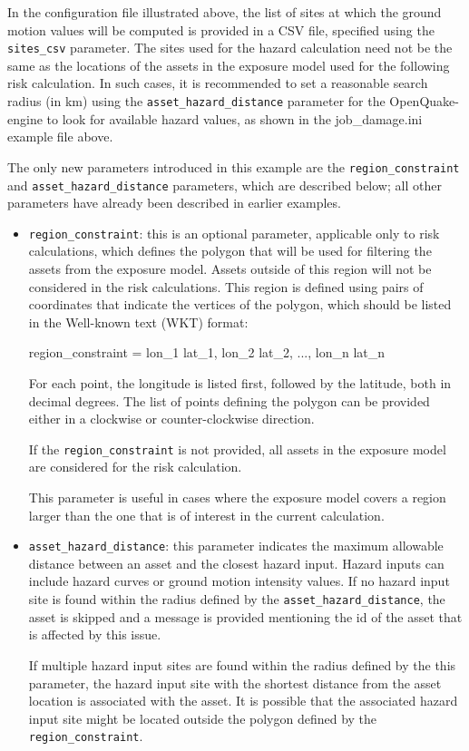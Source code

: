 In the configuration file illustrated above, the list of sites at which the
ground motion values will be computed is provided in a CSV file, specified
using the \Verb+sites_csv+ parameter. The sites used for the hazard
calculation need not be the same as the locations of the assets in the
exposure model used for the following risk calculation. In such cases, it is
recommended to set a reasonable search radius (in km) using the
\Verb+asset_hazard_distance+ parameter for the OpenQuake-engine to look for
available hazard values, as shown in the job\_damage.ini example file above.

The only new parameters introduced in this example are the
\Verb+region_constraint+ and \Verb+asset_hazard_distance+ parameters, which
are described below; all other parameters have already been described in
earlier examples.

\begin{itemize}

  \item \Verb+region_constraint+: this is an optional parameter, applicable
    only to risk calculations, which defines the polygon that will be used for
    filtering the assets from the exposure model. Assets outside of this region
    will not be considered in the risk calculations. This region is defined
    using pairs of coordinates that indicate the vertices of the polygon, which
    should be listed in the Well-known text (WKT) format:

    region\_constraint = lon\_1 lat\_1, lon\_2 lat\_2, ..., lon\_n lat\_n

    For each point, the longitude is listed first, followed by the latitude,
    both in decimal degrees. The list of points defining the polygon can be
    provided either in a clockwise or counter-clockwise direction.

    If the \Verb+region_constraint+ is not provided, all assets in the exposure
    model are considered for the risk calculation.

    This parameter is useful in cases where the exposure model covers a region
    larger than the one that is of interest in the current calculation.

  \item \Verb+asset_hazard_distance+: this parameter indicates the maximum
    allowable distance between an \gls{asset} and the closest hazard input.
    Hazard inputs can include hazard curves or ground motion intensity values.
    If no hazard input site is found within the radius defined by the
    \Verb+asset_hazard_distance+, the asset is skipped and a message is
    provided mentioning the id of the asset that is affected by this issue.

    If multiple hazard input sites are found within the radius defined by the
    this parameter, the hazard input site with the shortest distance from the
    asset location is associated with the asset. It is possible that the
    associated hazard input site might be located outside the polygon defined
    by the \Verb+region_constraint+.

\end{itemize}

